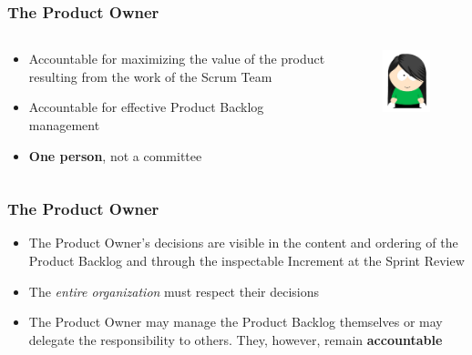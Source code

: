 \begin{frame}
	\frametitle{The Product Owner}
			
	\begin{columns}
		\begin{column}{0.7\textwidth}
			\begin{itemize}
				\setlength\itemsep{0.7em}
				\item Accountable for maximizing the value of the product resulting from the work of the Scrum Team
				\item Accountable for effective Product Backlog management
				\item \textbf{One person}, not a committee
			\end{itemize}
		\end{column}
		\begin{column}{0.3\textwidth}
			\vspace{-2em}
			\begin{figure}
				\includegraphics[width=1.6in]{images/po.jpg}
			\end{figure}
		\end{column}
	\end{columns}
\end{frame}

\begin{frame}
	\frametitle{The Product Owner}
			
	\begin{itemize}
		\setlength\itemsep{0.7em}
		\item The Product Owner's decisions are visible in the content and ordering of the Product Backlog and through the inspectable Increment at the Sprint Review
		\item The \textit{entire organization} must respect their decisions
		\item The Product Owner may manage the Product Backlog themselves or  may delegate the responsibility to others. They, however, remain \textbf{accountable}
	\end{itemize}
\end{frame}

